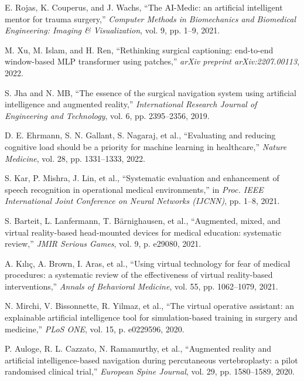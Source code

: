 \documentclass[12pt,a4paper]{report}
\begin{document}
\begin{enumerate}[label={[\arabic*]}, leftmargin=2.5em, itemsep=0.8em]
    \item E. Rojas, K. Couperus, and J. Wachs, ``The AI-Medic: an artificial intelligent mentor for trauma surgery,'' \textit{Computer Methods in Biomechanics and Biomedical Engineering: Imaging \& Visualization}, vol. 9, pp. 1--9, 2021.
    
    \item M. Xu, M. Islam, and H. Ren, ``Rethinking surgical captioning: end-to-end window-based MLP transformer using patches,'' \textit{arXiv preprint arXiv:2207.00113}, 2022.
    
    \item S. Jha and N. MB, ``The essence of the surgical navigation system using artificial intelligence and augmented reality,'' \textit{International Research Journal of Engineering and Technology}, vol. 6, pp. 2395--2356, 2019.
    
    \item D. E. Ehrmann, S. N. Gallant, S. Nagaraj, et al., ``Evaluating and reducing cognitive load should be a priority for machine learning in healthcare,'' \textit{Nature Medicine}, vol. 28, pp. 1331--1333, 2022.
    
    \item S. Kar, P. Mishra, J. Lin, et al., ``Systematic evaluation and enhancement of speech recognition in operational medical environments,'' in \textit{Proc. IEEE International Joint Conference on Neural Networks (IJCNN)}, pp. 1--8, 2021.
    
    \item S. Barteit, L. Lanfermann, T. B{\"{a}}rnighausen, et al., ``Augmented, mixed, and virtual reality-based head-mounted devices for medical education: systematic review,'' \textit{JMIR Serious Games}, vol. 9, p. e29080, 2021.
    
    \item A. K{\i}l{\i}\c{c}, A. Brown, I. Aras, et al., ``Using virtual technology for fear of medical procedures: a systematic review of the effectiveness of virtual reality-based interventions,'' \textit{Annals of Behavioral Medicine}, vol. 55, pp. 1062--1079, 2021.
    
    \item N. Mirchi, V. Bissonnette, R. Yilmaz, et al., ``The virtual operative assistant: an explainable artificial intelligence tool for simulation-based training in surgery and medicine,'' \textit{PLoS ONE}, vol. 15, p. e0229596, 2020.
    
    \item P. Auloge, R. L. Cazzato, N. Ramamurthy, et al., ``Augmented reality and artificial intelligence-based navigation during percutaneous vertebroplasty: a pilot randomised clinical trial,'' \textit{European Spine Journal}, vol. 29, pp. 1580--1589, 2020.
    

\end{enumerate}
\end{document}
